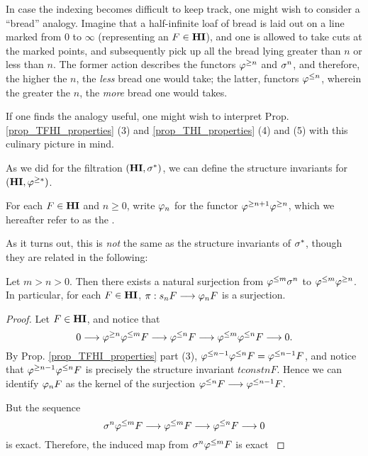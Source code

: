 \begin{rmk}
In case the indexing becomes difficult to keep track, one might
wish to consider a ``bread'' analogy. Imagine that a half-infinite 
loaf of bread is laid out on a line marked from 0 to $\infty$ 
(representing an $F \in \mathbf{HI}$), and one is allowed to take cuts at 
the marked points, and subsequently pick up all the bread lying 
greater than $n$ or less than $n$. The former action describes the 
functors $\varphi^{\geq n}$ and $\sigma^{n}$, and therefore, the higher the 
$n$, the \emph{less} bread one would take; the latter, functors 
$\varphi^{\leq n}$, wherein the greater the $n$, the \emph{more} bread one 
would takes.

If one finds the analogy useful, one might wish to interpret
Prop. \ref{prop_TFHI_properties} (3) and \ref{prop_THI_properties} (4)
and (5) with this culinary picture in mind.
\end{rmk}

As we did for the filtration $(\mathbf{HI}, \sigma^{*})$, we can define the 
structure invariants for $(\mathbf{HI}, \varphi^{\geq *})$. 
\begin{defn}
For each $F \in \mathbf{HI}$ and $n \geq 0$, write $\varphi_{n}$ for the functor 
$\varphi^{\geq n + 1} \varphi^{\geq n}$, which we hereafter refer to as the 
. 
\end{defn}

As it turns out, this is \emph{not} the same as the structure 
invariants of $\sigma^{*}$, though they are related in the following:

\begin{prop}\label{prop_struct_consts}
Let $m > n > 0$. Then there exists a natural surjection from 
$\varphi^{\leq m} \sigma^{n}$ to $\varphi^{\leq m} \varphi^{\geq n}$. In particular, for 
each $F \in \mathbf{HI}$, $\pi: s_n F \longrightarrow \varphi_{n} F$ is a 
surjection.
\end{prop}
\begin{proof}
Let $F \in \mathbf{HI}$, and notice that
\[
0 \longrightarrow \varphi^{\geq n} \varphi^{\leq m} F \longrightarrow \varphi^{\leq n} F \longrightarrow 
  \varphi^{\leq m} \varphi^{\leq n} F \longrightarrow 0.
\]
By Prop. \ref{prop_TFHI_properties} part (3), $\varphi^{\leq n - 1} 
\varphi^{\leq n} F = \varphi^{\leq n - 1} F$, and notice that $\varphi^{\geq n - 1} 
\varphi^{\leq n} F$ is precisely the structure invariant $tconst{n} F$.
Hence we can identify $\varphi_{n} F$ as the kernel of the 
surjection $\varphi^{\leq n} F \longrightarrow \varphi^{\leq n - 1} F$.

But the sequence
\[
\sigma^{n} \varphi^{\leq m} F \longrightarrow \varphi^{\leq m} F \longrightarrow \varphi^{\leq n} F \longrightarrow 0
\]
is exact. Therefore, the induced map from $\sigma^{n} \varphi^{\leq m} F$
is exact
\label{prop_sg_tl_commuute}
\end{proof}
